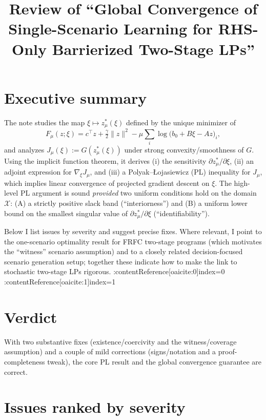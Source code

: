 \documentclass[11pt]{article}
\title{Review of ``Global Convergence of Single-Scenario Learning for RHS-Only Barrierized Two-Stage LPs''}
\date{}
\theoremstyle{definition}
\begin{document}
\maketitle

\section*{Executive summary}
The note studies the map $\xi\mapsto z^*_\mu(\xi)$ defined by the unique minimizer of 
\[
F_\mu(z;\xi)=c^\top z+\tfrac{\gamma}{2}\|z\|^2-\mu\sum_i \log\big(b_0+B\xi-Az\big)_i,
\]
and analyzes $J_\mu(\xi):=G(z^*_\mu(\xi))$ under strong convexity/smoothness of $G$. Using the implicit function theorem, it derives (i) the sensitivity $\partial z^*_\mu/\partial \xi$, (ii) an adjoint expression for $\nabla_\xi J_\mu$, and (iii) a Polyak–Łojasiewicz (PL) inequality for $J_\mu$, which implies linear convergence of projected gradient descent on $\xi$.
The high-level PL argument is sound \emph{provided} two uniform conditions hold on the domain $\mathcal X$: (A) a strictly positive slack band (``interiorness'') and (B) a uniform lower bound on the smallest singular value of $\partial z^*_\mu/\partial \xi$ (``identifiability''). 

Below I list issues by severity and suggest precise fixes. Where relevant, I point to the one-scenario optimality result for FRFC two-stage programs (which motivates the ``witness'' scenario assumption) and to a closely related decision-focused scenario generation setup; together these indicate how to make the link to stochastic two-stage LPs rigorous. :contentReference[oaicite:0]{index=0} :contentReference[oaicite:1]{index=1}

\section*{Verdict}
With two substantive fixes (existence/coercivity and the witness/coverage assumption) and a couple of mild corrections (signs/notation and a proof-completeness tweak), the core PL result and the global convergence guarantee are correct.

\section*{Issues ranked by severity}
\end{document}
